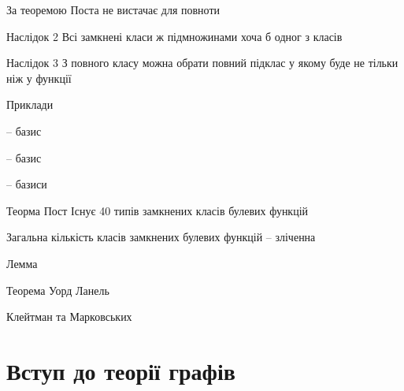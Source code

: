 За теоремою Поста не вистачає  для повноти

Наслідок 2
Всі замкнені класи ж підмножинами хоча б одног з класів

Наслідок 3
З повного класу  можна обрати повний підклас у якому буде не тільки ніж у функції

Приклади

-- базис

-- базис

-- базиси

Теорма Пост
Існує 40 типів замкнених класів булевих функцій

Загальна кількість класів замкнених булевих функцій -- зліченна

Лемма

Теорема Уорд Ланель

Клейтман та Марковських


\section{Вступ до теорії графів}










